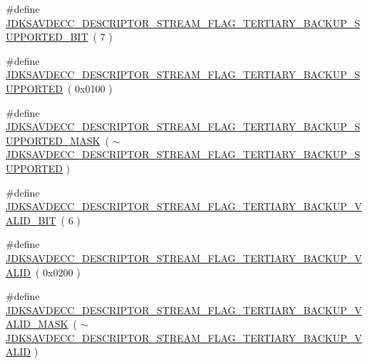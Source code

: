 \begin{DoxyCompactItemize}
\#define \hyperlink{group__descriptor__stream_gac04aab5115db422ecc4f64276b4101cd}{J\+D\+K\+S\+A\+V\+D\+E\+C\+C\+\_\+\+D\+E\+S\+C\+R\+I\+P\+T\+O\+R\+\_\+\+S\+T\+R\+E\+A\+M\+\_\+\+F\+L\+A\+G\+\_\+\+T\+E\+R\+T\+I\+A\+R\+Y\+\_\+\+B\+A\+C\+K\+U\+P\+\_\+\+S\+U\+P\+P\+O\+R\+T\+E\+D\+\_\+\+B\+IT}~( 7 )
\item 
\#define \hyperlink{group__descriptor__stream_ga33152086ac0df3d2a534416f7a05a5c5}{J\+D\+K\+S\+A\+V\+D\+E\+C\+C\+\_\+\+D\+E\+S\+C\+R\+I\+P\+T\+O\+R\+\_\+\+S\+T\+R\+E\+A\+M\+\_\+\+F\+L\+A\+G\+\_\+\+T\+E\+R\+T\+I\+A\+R\+Y\+\_\+\+B\+A\+C\+K\+U\+P\+\_\+\+S\+U\+P\+P\+O\+R\+T\+ED}~( 0x0100 )
\item 
\#define \hyperlink{group__descriptor__stream_ga531ce7f26238bcc33020e452b270f686}{J\+D\+K\+S\+A\+V\+D\+E\+C\+C\+\_\+\+D\+E\+S\+C\+R\+I\+P\+T\+O\+R\+\_\+\+S\+T\+R\+E\+A\+M\+\_\+\+F\+L\+A\+G\+\_\+\+T\+E\+R\+T\+I\+A\+R\+Y\+\_\+\+B\+A\+C\+K\+U\+P\+\_\+\+S\+U\+P\+P\+O\+R\+T\+E\+D\+\_\+\+M\+A\+SK}~( $\sim$\hyperlink{group__descriptor__stream_ga33152086ac0df3d2a534416f7a05a5c5}{J\+D\+K\+S\+A\+V\+D\+E\+C\+C\+\_\+\+D\+E\+S\+C\+R\+I\+P\+T\+O\+R\+\_\+\+S\+T\+R\+E\+A\+M\+\_\+\+F\+L\+A\+G\+\_\+\+T\+E\+R\+T\+I\+A\+R\+Y\+\_\+\+B\+A\+C\+K\+U\+P\+\_\+\+S\+U\+P\+P\+O\+R\+T\+ED} )
\item 
\#define \hyperlink{group__descriptor__stream_ga16ca76d94821e473f9da2aa3650d4b13}{J\+D\+K\+S\+A\+V\+D\+E\+C\+C\+\_\+\+D\+E\+S\+C\+R\+I\+P\+T\+O\+R\+\_\+\+S\+T\+R\+E\+A\+M\+\_\+\+F\+L\+A\+G\+\_\+\+T\+E\+R\+T\+I\+A\+R\+Y\+\_\+\+B\+A\+C\+K\+U\+P\+\_\+\+V\+A\+L\+I\+D\+\_\+\+B\+IT}~( 6 )
\item 
\#define \hyperlink{group__descriptor__stream_gafacea10dc225112ab367e4c34f7ce63e}{J\+D\+K\+S\+A\+V\+D\+E\+C\+C\+\_\+\+D\+E\+S\+C\+R\+I\+P\+T\+O\+R\+\_\+\+S\+T\+R\+E\+A\+M\+\_\+\+F\+L\+A\+G\+\_\+\+T\+E\+R\+T\+I\+A\+R\+Y\+\_\+\+B\+A\+C\+K\+U\+P\+\_\+\+V\+A\+L\+ID}~( 0x0200 )
\item 
\#define \hyperlink{group__descriptor__stream_gac23fec070cd3163675fc90a7cd3e753b}{J\+D\+K\+S\+A\+V\+D\+E\+C\+C\+\_\+\+D\+E\+S\+C\+R\+I\+P\+T\+O\+R\+\_\+\+S\+T\+R\+E\+A\+M\+\_\+\+F\+L\+A\+G\+\_\+\+T\+E\+R\+T\+I\+A\+R\+Y\+\_\+\+B\+A\+C\+K\+U\+P\+\_\+\+V\+A\+L\+I\+D\+\_\+\+M\+A\+SK}~( $\sim$\hyperlink{group__descriptor__stream_gafacea10dc225112ab367e4c34f7ce63e}{J\+D\+K\+S\+A\+V\+D\+E\+C\+C\+\_\+\+D\+E\+S\+C\+R\+I\+P\+T\+O\+R\+\_\+\+S\+T\+R\+E\+A\+M\+\_\+\+F\+L\+A\+G\+\_\+\+T\+E\+R\+T\+I\+A\+R\+Y\+\_\+\+B\+A\+C\+K\+U\+P\+\_\+\+V\+A\+L\+ID} )
\end{DoxyCompactItemize}
